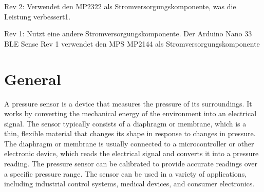 Rev 2: Verwendet den MP2322 als Stromversorgungskomponente, was die Leistung verbessert1.

Rev 1: Nutzt eine andere Stromversorgungskomponente.
Der Arduino Nano 33 BLE Sense Rev 1 verwendet den MPS MP2144 als Stromversorgungskomponente

\begin{center}    
    
\end{center}




\section{General}

A pressure sensor is a device that measures the pressure of its surroundings. It works by converting the mechanical energy of the environment into an electrical signal. The sensor typically consists of a diaphragm or membrane, which is a thin, flexible material that changes its shape in response to changes in pressure. The diaphragm or membrane is usually connected to a microcontroller or other electronic device, which reads the electrical signal and converts it into a pressure reading. The pressure sensor can be calibrated to provide accurate readings over a specific pressure range. The sensor can be used in a variety of applications, including industrial control systems, medical devices, and consumer electronics.

